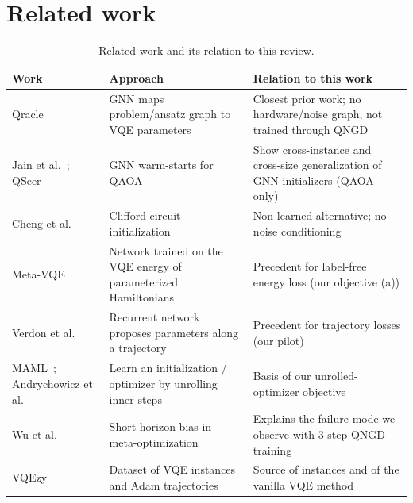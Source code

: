 \documentclass{ssnreview}
\begin{document}
\section{Related work}

\begin{table}[H]
\centering
\caption{Related work and its relation to this review.}\label{tab:related}
\small
\begin{tabularx}{\textwidth}{L{3.3cm}YY}
\toprule
Work & Approach & Relation to this work \\
\midrule
Qracle~\cite{qracle} & GNN maps problem/ansatz graph to VQE parameters & Closest prior work; no hardware/noise graph, not trained through QNGD \\
Jain et al.~\cite{jain2022}; QSeer~\cite{qseer} & GNN warm-starts for QAOA & Show cross-instance and cross-size generalization of GNN initializers (QAOA only) \\
Cheng et al.~\cite{cheng2025} & Clifford-circuit initialization & Non-learned alternative; no noise conditioning \\
Meta-VQE~\cite{metavqe} & Network trained on the VQE energy of parameterized Hamiltonians & Precedent for label-free energy loss (our objective (a)) \\
Verdon et al.~\cite{verdon2019} & Recurrent network proposes parameters along a trajectory & Precedent for trajectory losses (our pilot) \\
MAML~\cite{maml}; Andrychowicz et al.~\cite{andrychowicz2016} & Learn an initialization / optimizer by unrolling inner steps & Basis of our unrolled-optimizer objective \\
Wu et al.~\cite{wu2018} & Short-horizon bias in meta-optimization & Explains the failure mode we observe with 3-step QNGD training \\
VQEzy~\cite{vqezy} & Dataset of VQE instances and Adam trajectories & Source of instances and of the vanilla VQE method \\
\bottomrule
\end{tabularx}
\end{table}
\end{document}
